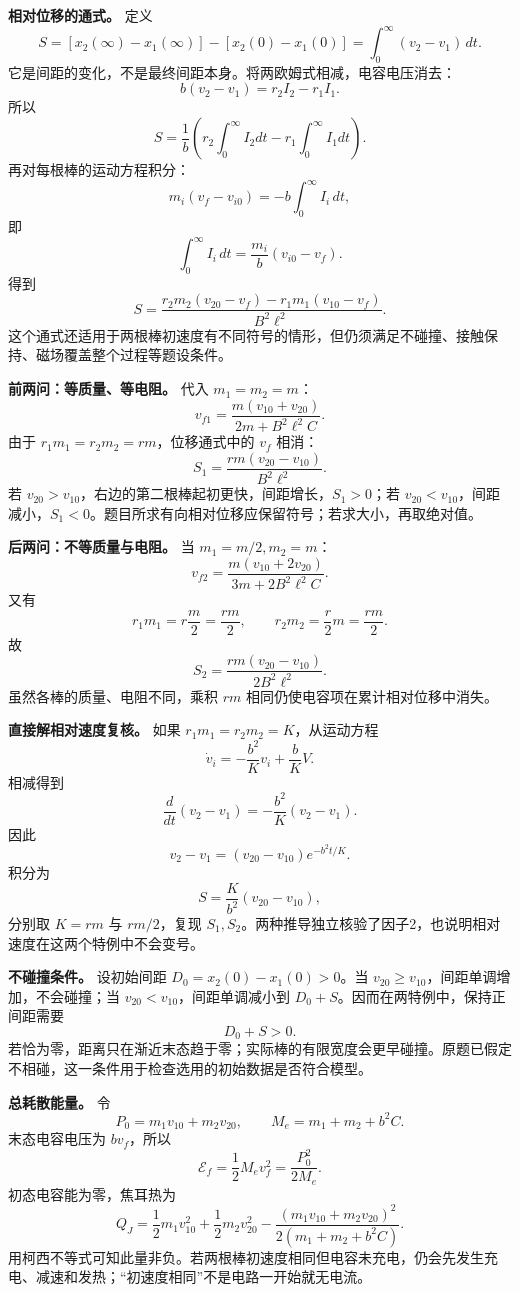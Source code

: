 \documentclass[12pt,a4paper,UTF8]{ctexart}
\begin{document}
\textbf{相对位移的通式。} 定义 \[
S=[x_2(\infty)-x_1(\infty)]-[x_2(0)-x_1(0)]
=\int_0^\infty(v_2-v_1)\,dt.
\] 它是间距的变化，不是最终间距本身。将两欧姆式相减，电容电压消去： \[
b(v_2-v_1)=r_2I_2-r_1I_1.
\] 所以 \[
S=\frac1b\left(r_2\int_0^\infty I_2dt-r_1\int_0^\infty I_1dt\right).
\] 再对每根棒的运动方程积分： \[
m_i(v_f-v_{i0})=-b\int_0^\infty I_i\,dt,
\] 即 \[
\int_0^\infty I_i\,dt=\frac{m_i}{b}(v_{i0}-v_f).
\] 得到 \[
\boxed{S=
\frac{r_2m_2(v_{20}-v_f)-r_1m_1(v_{10}-v_f)}{B^2\ell^2}}.
\]
这个通式还适用于两根棒初速度有不同符号的情形，但仍须满足不碰撞、接触保持、磁场覆盖整个过程等题设条件。

\textbf{前两问：等质量、等电阻。} 代入 \(m_1=m_2=m\)： \[
\boxed{v_{f1}=\frac{m(v_{10}+v_{20})}{2m+B^2\ell^2C}}.
\] 由于 \(r_1m_1=r_2m_2=rm\)，位移通式中的 \(v_f\) 相消： \[
\boxed{S_1=\frac{rm(v_{20}-v_{10})}{B^2\ell^2}}.
\] 若 \(v_{20}>v_{10}\)，右边的第二根棒起初更快，间距增长，\(S_1>0\)；若
\(v_{20}<v_{10}\)，间距减小，\(S_1<0\)。题目所求有向相对位移应保留符号；若求大小，再取绝对值。

\textbf{后两问：不等质量与电阻。} 当 \(m_1=m/2,m_2=m\)： \[
\boxed{v_{f2}=\frac{m(v_{10}+2v_{20})}{3m+2B^2\ell^2C}}.
\] 又有 \[
r_1m_1=r\frac m2=\frac{rm}{2},\qquad
r_2m_2=\frac r2m=\frac{rm}{2}.
\] 故 \[
\boxed{S_2=\frac{rm(v_{20}-v_{10})}{2B^2\ell^2}}.
\] 虽然各棒的质量、电阻不同，乘积 \(rm\)
相同仍使电容项在累计相对位移中消失。

\textbf{直接解相对速度复核。} 如果 \(r_1m_1=r_2m_2=K\)，从运动方程 \[
\dot v_i=-\frac{b^2}{K}v_i+\frac{b}{K}V.
\] 相减得到 \[
\frac{d}{dt}(v_2-v_1)=-\frac{b^2}{K}(v_2-v_1).
\] 因此 \[
v_2-v_1=(v_{20}-v_{10})e^{-b^2t/K}.
\] 积分为 \[
S=\frac{K}{b^2}(v_{20}-v_{10}),
\] 分别取 \(K=rm\) 与 \(rm/2\)，复现
\(S_1,S_2\)。两种推导独立核验了因子2，也说明相对速度在这两个特例中不会变号。

\textbf{不碰撞条件。} 设初始间距 \(D_0=x_2(0)-x_1(0)>0\)。当
\(v_{20}\ge v_{10}\)，间距单调增加，不会碰撞；当
\(v_{20}<v_{10}\)，间距单调减小到
\(D_0+S\)。因而在两特例中，保持正间距需要 \[
\boxed{D_0+S>0}.
\]
若恰为零，距离只在渐近末态趋于零；实际棒的有限宽度会更早碰撞。原题已假定不相碰，这一条件用于检查选用的初始数据是否符合模型。

\textbf{总耗散能量。} 令 \[
P_0=m_1v_{10}+m_2v_{20},\qquad
M_e=m_1+m_2+b^2C.
\] 末态电容电压为 \(bv_f\)，所以 \[
\mathcal E_f=\frac12M_ev_f^2=\frac{P_0^2}{2M_e}.
\] 初态电容能为零，焦耳热为 \[
\boxed{Q_J=
\frac12m_1v_{10}^2+\frac12m_2v_{20}^2
-\frac{(m_1v_{10}+m_2v_{20})^2}{2(m_1+m_2+b^2C)}}.
\]
用柯西不等式可知此量非负。若两根棒初速度相同但电容未充电，仍会先发生充电、减速和发热；``初速度相同''不是电路一开始就无电流。
\end{document}
